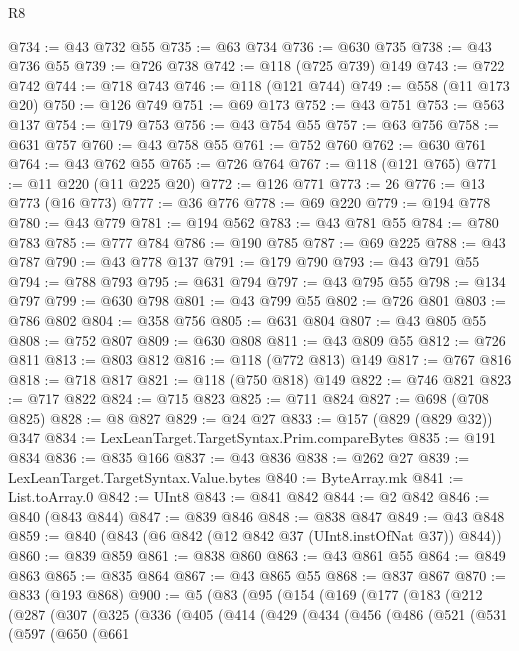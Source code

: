 \begin{lexlean}{R8}
\begin{coremodule}
@734 := @43 @732 @55
@735 := @63 @734
@736 := @630 @735
@738 := @43 @736 @55
@739 := @726 @738
@742 := @118 (@725 @739) @149
@743 := @722 @742
@744 := @718 @743
@746 := @118 (@121 @744)
@749 := @558 (@11 @173 @20)
@750 := @126 @749
@751 := @69 @173
@752 := @43 @751
@753 := @563 @137
@754 := @179 @753
@756 := @43 @754 @55
@757 := @63 @756
@758 := @631 @757
@760 := @43 @758 @55
@761 := @752 @760
@762 := @630 @761
@764 := @43 @762 @55
@765 := @726 @764
@767 := @118 (@121 @765)
@771 := @11 @220 (@11 @225 @20)
@772 := @126 @771
@773 := 26
@776 := @13 @773 (@16 @773)
@777 := @36 @776
@778 := @69 @220
@779 := @194 @778
@780 := @43 @779
@781 := @194 @562
@783 := @43 @781 @55
@784 := @780 @783
@785 := @777 @784
@786 := @190 @785
@787 := @69 @225
@788 := @43 @787
@790 := @43 @778 @137
@791 := @179 @790
@793 := @43 @791 @55
@794 := @788 @793
@795 := @631 @794
@797 := @43 @795 @55
@798 := @134 @797
@799 := @630 @798
@801 := @43 @799 @55
@802 := @726 @801
@803 := @786 @802
@804 := @358 @756
@805 := @631 @804
@807 := @43 @805 @55
@808 := @752 @807
@809 := @630 @808
@811 := @43 @809 @55
@812 := @726 @811
@813 := @803 @812
@816 := @118 (@772 @813) @149
@817 := @767 @816
@818 := @718 @817
@821 := @118 (@750 @818) @149
@822 := @746 @821
@823 := @717 @822
@824 := @715 @823
@825 := @711 @824
@827 := @698 (@708 @825)
@828 := @8 @827
@829 := @24 @27
@833 := @157 (@829 (@829 @32)) @347
@834 := LexLeanTarget.TargetSyntax.Prim.compareBytes
@835 := @191 @834
@836 := @835 @166
@837 := @43 @836
@838 := @262 @27
@839 := LexLeanTarget.TargetSyntax.Value.bytes
@840 := ByteArray.mk
@841 := List.toArray.{0}
@842 := UInt8
@843 := @841 @842
@844 := @2 @842
@846 := @840 (@843 @844)
@847 := @839 @846
@848 := @838 @847
@849 := @43 @848
@859 := @840 (@843 (@6 @842 (@12 @842 @37 (UInt8.instOfNat @37)) @844))
@860 := @839 @859
@861 := @838 @860
@863 := @43 @861 @55
@864 := @849 @863
@865 := @835 @864
@867 := @43 @865 @55
@868 := @837 @867
@870 := @833 (@193 @868)
@900 := @5
    (@83
      (@95
        (@154
          (@169
            (@177
              (@183
                (@212
                  (@287
                    (@307
                      (@325
                        (@336
                          (@405
                            (@414
                              (@429
                                (@434
                                  (@456
                                    (@486
                                      (@521
                                        (@531
                                          (@597
                                            (@650
                                              (@661

\end{coremodule}
\end{lexlean}

